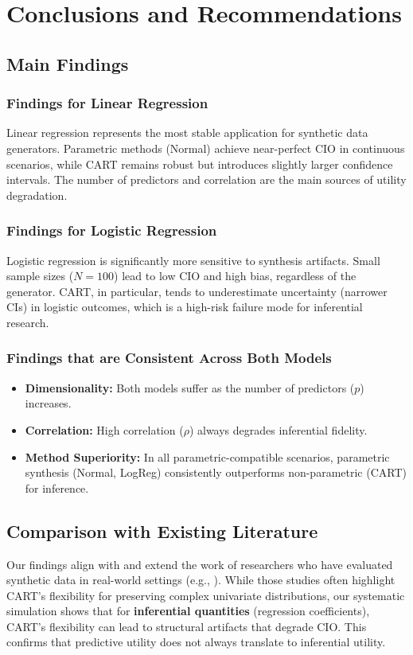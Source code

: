 \chapter{Conclusions and Recommendations}
\label{chap:regression-conclusions}

\section{Main Findings}
\label{sec:reg-main-findings}

\subsection{Findings for Linear Regression}
Linear regression represents the most stable application for synthetic data generators. Parametric methods (Normal) achieve near-perfect CIO in continuous scenarios, while CART remains robust but introduces slightly larger confidence intervals. The number of predictors and correlation are the main sources of utility degradation.

\subsection{Findings for Logistic Regression}
Logistic regression is significantly more sensitive to synthesis artifacts. Small sample sizes ($N=100$) lead to low CIO and high bias, regardless of the generator. CART, in particular, tends to underestimate uncertainty (narrower CIs) in logistic outcomes, which is a high-risk failure mode for inferential research.

\subsection{Findings that are Consistent Across Both Models}
\begin{itemize}
    \item \textbf{Dimensionality:} Both models suffer as the number of predictors ($p$) increases.
    \item \textbf{Correlation:} High correlation ($\rho$) always degrades inferential fidelity.
    \item \textbf{Method Superiority:} In all parametric-compatible scenarios, parametric synthesis (Normal, LogReg) consistently outperforms non-parametric (CART) for inference.
\end{itemize}

\section{Comparison with Existing Literature}
Our findings align with and extend the work of researchers who have evaluated synthetic data in real-world settings (e.g., \cite{nowok2016, raab2016}). While those studies often highlight CART's flexibility for preserving complex univariate distributions, our systematic simulation shows that for \textbf{inferential quantities} (regression coefficients), CART's flexibility can lead to structural artifacts that degrade CIO. This confirms that predictive utility does not always translate to inferential utility.

